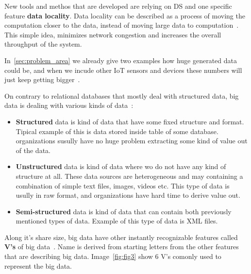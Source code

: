 New tools and methos that are developed are relying on DS and one specific feature \textbf{data locality}. Data locality can be described as a process of moving the computation closer to the data, instead of moving large data to computation~\cite{GuoFZ12}. This simple idea, minimizes network congestion and increases the overall throughput of the system.

In~\ref{sec:problem_area} we already give two examples how huge generated data could be, and when we incude other IoT sensors and devices these numbers will just keep getting bigger~\cite{SarigiannidisLR20}.

On contrary to relational databases that mostly deal with structured data, big data is dealing with various kinds of data~\cite{FisherDCD12, Tsai2015, GuoFZ12}:

\begin{itemize}
	\item \textbf{Structured} data is kind of data that have some fixed structure and format. Tipical example of this is data stored inside table of some database. organizations susully have no huge problem extracting some kind of value out of the data.
	\item \textbf{Unstructured} data is kind of data where wo do not have any kind of structure at all. These data sources are heterogeneous and may containing a combination of simple text files, images, videos etc. This type of data is usully in raw format, and organizations have hard time to derive value out.
	\item \textbf{Semi-structured} data is kind of data that can contain both previously mentioned types of data. Example of this type of data is XML files.
\end{itemize}

Along it's share size, big data have other instantly recognizable features called \textbf{V's} of big data~\cite{PatgiriA16}. Name is derived from starting letters from the other features that are describing big data. Image~\ref{fig:fig3} show 6 V's comonly used to represent the big data.

